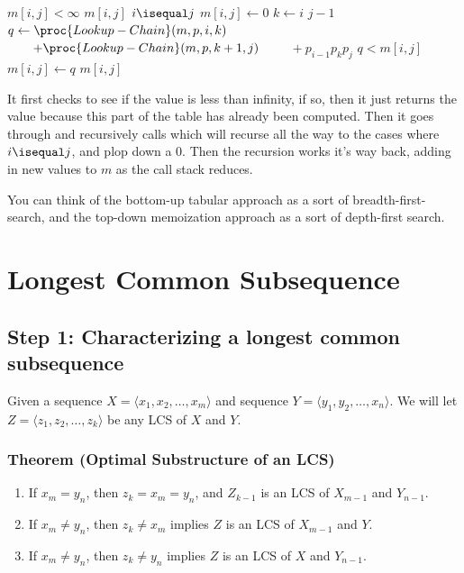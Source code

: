 \documentclass[11pt]{article}
\theoremstyle{definition}
\begin{document}
\begin{codebox}
  \li \If \(m[i,j] < \infty\) \Then 
    \li \Return \(m[i,j]\) \End
  \li \If \(i \isequal j\) \Then 
    \li \(m[i,j] \gets 0\) \End
  \li \Else \For \(k \gets i\) \To \(j-1\) \Then \Do
      \li \(q \gets \proc{Lookup-Chain}(m,p,i,k)\)
      \zi \(\quad\quad + \proc{Lookup-Chain}(m,p,k+1,j)\)
      \zi \(\quad\quad + p_{i-1}p_kp_j\)
      \li \If \(q < m[i,j]\) \Then 
        \li \(m[i,j] \gets q\) \End \End \End 
  \li \Return \(m[i,j]\)
\end{codebox}

It first checks to see if the value is less than infinity, if so, then it just returns the value 
because this part of the table has already been computed.  Then it goes through and recursively 
calls  which will recurse all the way to the cases where \(i \isequal j\), and 
plop down a 0.  Then the recursion works it's way back, adding in new values to \(m\) as the call 
stack reduces.  

You can think of the bottom-up tabular approach as a sort of breadth-first-search, and the 
top-down memoization approach as a sort of depth-first search.
\newpage 

\section*{Longest Common Subsequence}
\subsection*{Step 1: Characterizing a longest common subsequence}
Given a sequence \(X = \langle x_1, x_2, \dots, x_m \rangle\) and sequence 
\(Y = \langle y_1, y_2, \dots, x_n \rangle\).  We will let 
\(Z = \langle z_1, z_2, \dots, z_k \rangle\) be any LCS of \(X\) and \(Y\).

\subsubsection*{Theorem (Optimal Substructure of an LCS)}
\begin{enumerate}
  \item If \(x_m = y_n\), then \(z_k = x_m = y_n\), and \(Z_{k-1}\) is an LCS of \(X_{m-1}\) and \(Y_{n-1}\).
  \item If \(x_m \not= y_n\), then \(z_k \not= x_m\) implies \(Z\) is an LCS of \(X_{m-1}\) and \(Y\).
  \item If \(x_m \not= y_n\), then \(z_k \not= y_n\) implies \(Z\) is an LCS of \(X\) and \(Y_{n-1}\).
\end{enumerate}
\end{document}
